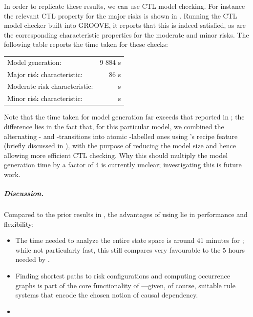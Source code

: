 In order to replicate these results, we can use CTL model checking. For instance the relevant CTL property for the major risks is shown in 
. Running the CTL model checker built into GROOVE, it reports that this is indeed satisfied, as are the corresponding characteristic properties for the moderate and minor risks. The following table reports the time taken for these checks:

\begin{center}
\begin{tabular}{lr}
Model generation: & 9 884 s \\
Major risk characteristic: & 86 s \\
Moderate risk characteristic: &  s \\
Minor risk characteristic: &  s \\
\end{tabular}
\end{center}
%
Note that the time taken for model generation far exceeds that reported in ; the difference lies in the fact that, for this particular model, we combined the alternating \contextR- and \reactR-transitions into atomic \fireR-labelled ones using \GROOVE's recipe feature (briefly discussed in ), with the purpose of reducing the model size and hence allowing more efficient CTL checking. Why this should multiply the model generation time by a factor of 4 is currently unclear; investigating this is future work.

\subparagraph*{Discussion.}

Compared to the prior results in \cite{DBLP:conf/cmsb/BowlesBBFGM24}, the advantages of using \GROOVE lie in performance and flexibility:
\begin{itemize}
\item The time needed to analyze the entire state space is around 41 minutes for \GROOVE; while not particularly fast, this still compares very favourable to the 5 hours needed by \BioResolve.

\item Finding shortest paths to risk configurations and computing occurrence graphs is part of the core functionality of \GROOVE---given, of course, suitable rule systems that encode the chosen notion of causal dependency.

\item {}
\end{itemize}

